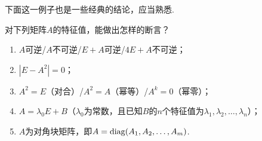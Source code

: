 下面这一例子也是一些经典的结论，应当熟悉.
\begin{example}\label{ex:18:特征值的性质}
    对下列矩阵$A$的特征值，能做出怎样的断言？
    \begin{enumerate}
        \item $A$可逆/$A$不可逆/$E+A$可逆/$4E+A$不可逆；

        \item $|E-A^2|=0$；

        \item $A^2=E$（对合）/$A^2=A$（幂等）/$A^k=0$（幂零）；

        \item $A=\lambda_0E+B$（$\lambda_0$为常数，且已知$B$的$n$个特征值为$\lambda_1,\lambda_2,\ldots,\lambda_n$）；

        \item $A$为对角块矩阵，即$A=\operatorname{diag}(A_1,A_2,\ldots,A_m)$.
    \end{enumerate}
\end{example}

